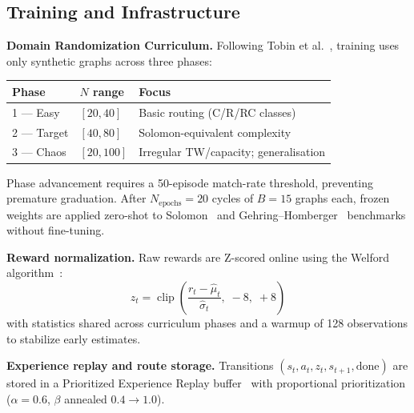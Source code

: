 \documentclass[conference]{IEEEtran}
\begin{document}
\subsection{Training and Infrastructure}
\label{sec:training}

\textbf{Domain Randomization Curriculum.}
Following Tobin et al.~\cite{tobin2017domain}, training uses only synthetic
graphs across three phases:

\begin{center}
\setlength{\tabcolsep}{4pt}
\small
\begin{tabular}{@{}lll@{}}
\toprule
\textbf{Phase} & \textbf{$N$ range} & \textbf{Focus}\\
\midrule
1 --- Easy   & $[20,40]$  & Basic routing (C/R/RC classes)\\
2 --- Target & $[40,80]$  & Solomon-equivalent complexity~\cite{Solomon1987}\\
3 --- Chaos  & $[20,100]$ & Irregular TW/capacity; generalisation\\
\bottomrule
\end{tabular}
\end{center}

Phase advancement requires a 50-episode match-rate threshold, preventing
premature graduation.  After $N_{\text{epochs}}{=}20$ cycles of $B{=}15$
graphs each, frozen weights are applied zero-shot to
Solomon~\cite{Solomon1987} and Gehring--Homberger~\cite{Gehring1999}
benchmarks without fine-tuning.

\textbf{Reward normalization.}
Raw rewards are Z-scored online using the Welford
algorithm~\cite{welford1962}:
\begin{equation}
  z_t = \operatorname{clip}\!\left(\frac{r_t - \hat\mu_t}{\hat\sigma_t},\;
    -8,\;+8\right)
  \label{eq:welford}
\end{equation}
with statistics shared across curriculum phases and a warmup of 128
observations to stabilize early estimates.

\textbf{Experience replay and route storage.}
Transitions $(s_t,a_t,z_t,s_{t+1},\text{done})$ are stored in a Prioritized
Experience Replay buffer~\cite{schaul2016prioritized} with proportional
prioritization ($\alpha{=}0.6$, $\beta$ annealed $0.4{\to}1.0$).
\end{document}
